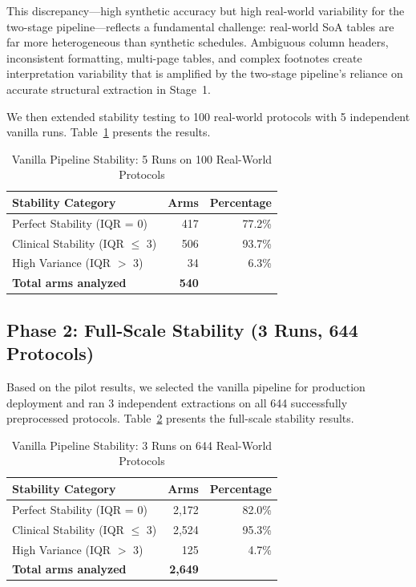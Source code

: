 \documentclass[11pt]{article}
\begin{document}
This discrepancy---high synthetic accuracy but high real-world variability for the two-stage pipeline---reflects a fundamental challenge: real-world SoA tables are far more heterogeneous than synthetic schedules. Ambiguous column headers, inconsistent formatting, multi-page tables, and complex footnotes create interpretation variability that is amplified by the two-stage pipeline's reliance on accurate structural extraction in Stage~1.

We then extended stability testing to 100 real-world protocols with 5 independent vanilla runs. Table~\ref{tab:stability_phase1} presents the results.

\begin{table}[H]
\centering
\caption{Vanilla Pipeline Stability: 5 Runs on 100 Real-World Protocols}
\label{tab:stability_phase1}
\begin{tabular}{lrr}
\toprule
\textbf{Stability Category} & \textbf{Arms} & \textbf{Percentage} \\
\midrule
Perfect Stability (IQR = 0) & 417 & 77.2\% \\
Clinical Stability (IQR $\leq$ 3) & 506 & 93.7\% \\
High Variance (IQR $>$ 3) & 34 & 6.3\% \\
\midrule
\textbf{Total arms analyzed} & \textbf{540} & \\
\bottomrule
\end{tabular}
\end{table}

\subsection{Phase 2: Full-Scale Stability (3 Runs, 644 Protocols)}

Based on the pilot results, we selected the vanilla pipeline for production deployment and ran 3 independent extractions on all 644 successfully preprocessed protocols. Table~\ref{tab:stability_phase2} presents the full-scale stability results.

\begin{table}[H]
\centering
\caption{Vanilla Pipeline Stability: 3 Runs on 644 Real-World Protocols}
\label{tab:stability_phase2}
\begin{tabular}{lrr}
\toprule
\textbf{Stability Category} & \textbf{Arms} & \textbf{Percentage} \\
\midrule
Perfect Stability (IQR = 0) & 2,172 & 82.0\% \\
Clinical Stability (IQR $\leq$ 3) & 2,524 & 95.3\% \\
High Variance (IQR $>$ 3) & 125 & 4.7\% \\
\midrule
\textbf{Total arms analyzed} & \textbf{2,649} & \\
\bottomrule
\end{tabular}
\end{table}
\end{document}

